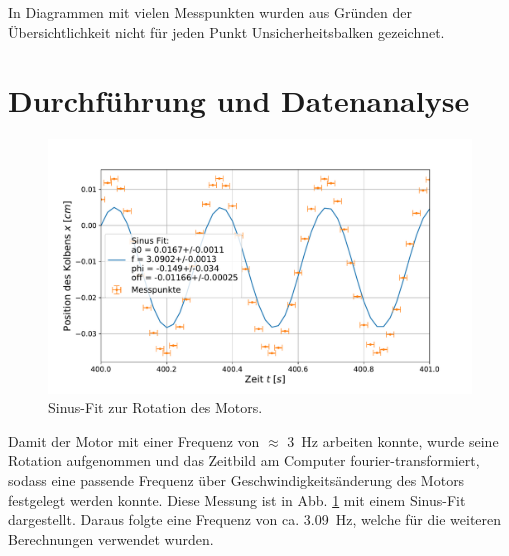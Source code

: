 		In Diagrammen mit vielen Messpunkten wurden aus Gründen der Übersichtlichkeit nicht für jeden Punkt Unsicherheitsbalken gezeichnet.
		
\section{Durchführung und Datenanalyse}	
	\begin{figure}[ht]
		\centering
		\includegraphics[width=\textwidth]{data/Position.pdf}
		\caption{Sinus-Fit zur Rotation des Motors.}
		\label{fig:Frequenz}	
	\end{figure}
	Damit der Motor mit einer Frequenz von $\approx$ \SI{3}{\hertz} arbeiten konnte, wurde seine Rotation aufgenommen und das Zeitbild am Computer fourier-transformiert, sodass eine passende Frequenz über Geschwindigkeitsänderung des Motors festgelegt werden konnte.
	Diese Messung ist in Abb. \ref{fig:Frequenz} mit einem Sinus-Fit dargestellt.
	Daraus folgte eine Frequenz von ca. \SI{3,09}{\hertz}, welche für die weiteren Berechnungen verwendet wurden.
	

